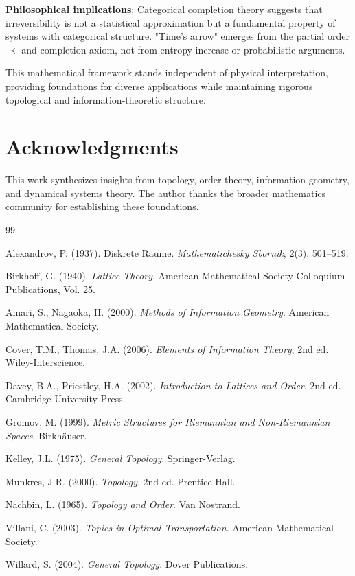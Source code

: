 \documentclass[12pt,a4paper]{article}
\begin{document}
\textbf{Philosophical implications}: Categorical completion theory suggests that irreversibility is not a statistical approximation but a fundamental property of systems with categorical structure. "Time's arrow" emerges from the partial order $\prec$ and completion axiom, not from entropy increase or probabilistic arguments.

This mathematical framework stands independent of physical interpretation, providing foundations for diverse applications while maintaining rigorous topological and information-theoretic structure.

\section*{Acknowledgments}

This work synthesizes insights from topology, order theory, information geometry, and dynamical systems theory. The author thanks the broader mathematics community for establishing these foundations.


\begin{thebibliography}{99}

Alexandrov, P. (1937). Diskrete Räume. \textit{Mathematichesky Sbornik}, 2(3), 501--519.

Birkhoff, G. (1940). \textit{Lattice Theory}. American Mathematical Society Colloquium Publications, Vol. 25.

Amari, S., Nagaoka, H. (2000). \textit{Methods of Information Geometry}. American Mathematical Society.

Cover, T.M., Thomas, J.A. (2006). \textit{Elements of Information Theory}, 2nd ed. Wiley-Interscience.

Davey, B.A., Priestley, H.A. (2002). \textit{Introduction to Lattices and Order}, 2nd ed. Cambridge University Press.

Gromov, M. (1999). \textit{Metric Structures for Riemannian and Non-Riemannian Spaces}. Birkhäuser.

Kelley, J.L. (1975). \textit{General Topology}. Springer-Verlag.

Munkres, J.R. (2000). \textit{Topology}, 2nd ed. Prentice Hall.

Nachbin, L. (1965). \textit{Topology and Order}. Van Nostrand.

Villani, C. (2003). \textit{Topics in Optimal Transportation}. American Mathematical Society.

Willard, S. (2004). \textit{General Topology}. Dover Publications.

\end{thebibliography}
\end{document}
